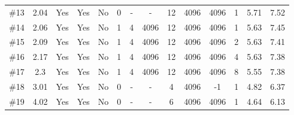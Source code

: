 \begin{table}[hbt!]
{\begin{tabular}{c|c|c|cc|ccc|cccc|cc}
\#13 & 2.04 & Yes & Yes & No  & 0 & - & -    & 12 & 4096  & 4096 & 1 & 5.71  & 7.52  \\
\#14 & 2.06 & Yes & Yes & No  & 1 & 4 & 4096 & 12 & 4096  & 4096 & 1 & 5.63  & 7.45  \\
\#15 & 2.09 & Yes & Yes & No  & 1 & 4 & 4096 & 12 & 4096  & 4096 & 2 & 5.63  & 7.41  \\
\#16 & 2.17 & Yes & Yes & No  & 1 & 4 & 4096 & 12 & 4096  & 4096 & 4 & 5.63  & 7.38  \\
\#17 & 2.3  & Yes & Yes & No  & 1 & 4 & 4096 & 12 & 4096  & 4096 & 8 & 5.55  & 7.38  \\
\#18 & 3.01 & Yes & Yes & No  & 0 & - & -    & 4  & 4096  & -1   & 1 & 4.82  & 6.37  \\
\#19 & 4.02 & Yes & Yes & No  & 0 & - & -    & 6  & 4096  & 4096 & 1 & 4.64  & 6.13  \\ \hline
\end{tabular}%
}

\label{tab:ablation_study}
\end{table}